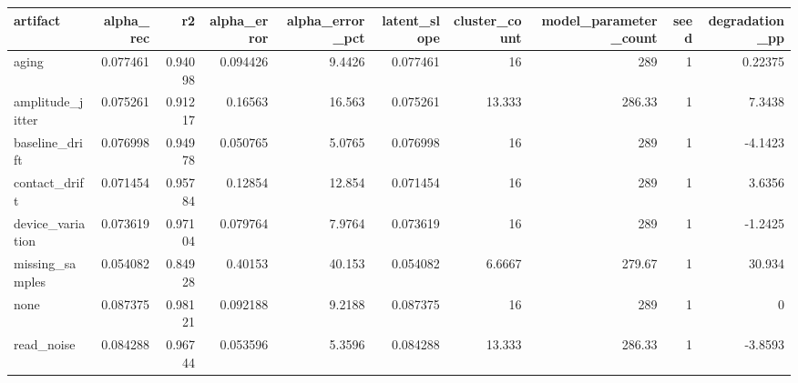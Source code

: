 \begin{tabular}{lrrrrrrrrr}
\toprule
artifact & alpha\_rec & r2 & alpha\_error & alpha\_error\_pct & latent\_slope & cluster\_count & model\_parameter\_count & seed & degradation\_pp \\
\midrule
aging & 0.077461 & 0.94098 & 0.094426 & 9.4426 & 0.077461 & 16 & 289 & 1 & 0.22375 \\
amplitude\_jitter & 0.075261 & 0.91217 & 0.16563 & 16.563 & 0.075261 & 13.333 & 286.33 & 1 & 7.3438 \\
baseline\_drift & 0.076998 & 0.94978 & 0.050765 & 5.0765 & 0.076998 & 16 & 289 & 1 & -4.1423 \\
contact\_drift & 0.071454 & 0.95784 & 0.12854 & 12.854 & 0.071454 & 16 & 289 & 1 & 3.6356 \\
device\_variation & 0.073619 & 0.97104 & 0.079764 & 7.9764 & 0.073619 & 16 & 289 & 1 & -1.2425 \\
missing\_samples & 0.054082 & 0.84928 & 0.40153 & 40.153 & 0.054082 & 6.6667 & 279.67 & 1 & 30.934 \\
none & 0.087375 & 0.98121 & 0.092188 & 9.2188 & 0.087375 & 16 & 289 & 1 & 0 \\
read\_noise & 0.084288 & 0.96744 & 0.053596 & 5.3596 & 0.084288 & 13.333 & 286.33 & 1 & -3.8593 \\
\bottomrule
\end{tabular}
